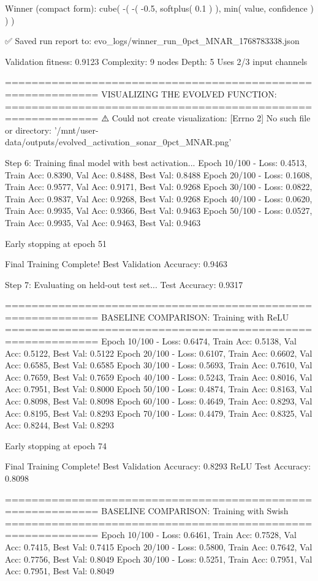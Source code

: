 Winner (compact form):
 cube(
  -(
    -(
      -0.5,
      softplus(
        0.1
      )
    ),
    min(
      value,
      confidence
    )
  )
)

✅ Saved run report to: evo_logs/winner_run_0pct_MNAR_1768783338.json

Validation fitness: 0.9123
Complexity: 9 nodes
Depth: 5
Uses 2/3 input channels

============================================================
VISUALIZING THE EVOLVED FUNCTION:
============================================================
⚠️ Could not create visualization: [Errno 2] No such file or directory: '/mnt/user-data/outputs/evolved_activation_sonar_0pct_MNAR.png'

Step 6: Training final model with best activation...
Epoch  10/100 - Loss: 0.4513, Train Acc: 0.8390, Val Acc: 0.8488, Best Val: 0.8488
Epoch  20/100 - Loss: 0.1608, Train Acc: 0.9577, Val Acc: 0.9171, Best Val: 0.9268
Epoch  30/100 - Loss: 0.0822, Train Acc: 0.9837, Val Acc: 0.9268, Best Val: 0.9268
Epoch  40/100 - Loss: 0.0620, Train Acc: 0.9935, Val Acc: 0.9366, Best Val: 0.9463
Epoch  50/100 - Loss: 0.0527, Train Acc: 0.9935, Val Acc: 0.9463, Best Val: 0.9463

Early stopping at epoch 51

Final Training Complete!
Best Validation Accuracy: 0.9463

Step 7: Evaluating on held-out test set...
Test Accuracy: 0.9317

============================================================
BASELINE COMPARISON: Training with ReLU
============================================================
Epoch  10/100 - Loss: 0.6474, Train Acc: 0.5138, Val Acc: 0.5122, Best Val: 0.5122
Epoch  20/100 - Loss: 0.6107, Train Acc: 0.6602, Val Acc: 0.6585, Best Val: 0.6585
Epoch  30/100 - Loss: 0.5693, Train Acc: 0.7610, Val Acc: 0.7659, Best Val: 0.7659
Epoch  40/100 - Loss: 0.5243, Train Acc: 0.8016, Val Acc: 0.7951, Best Val: 0.8000
Epoch  50/100 - Loss: 0.4874, Train Acc: 0.8163, Val Acc: 0.8098, Best Val: 0.8098
Epoch  60/100 - Loss: 0.4649, Train Acc: 0.8293, Val Acc: 0.8195, Best Val: 0.8293
Epoch  70/100 - Loss: 0.4479, Train Acc: 0.8325, Val Acc: 0.8244, Best Val: 0.8293

Early stopping at epoch 74

Final Training Complete!
Best Validation Accuracy: 0.8293
ReLU Test Accuracy: 0.8098

============================================================
BASELINE COMPARISON: Training with Swish
============================================================
Epoch  10/100 - Loss: 0.6461, Train Acc: 0.7528, Val Acc: 0.7415, Best Val: 0.7415
Epoch  20/100 - Loss: 0.5800, Train Acc: 0.7642, Val Acc: 0.7756, Best Val: 0.8049
Epoch  30/100 - Loss: 0.5251, Train Acc: 0.7951, Val Acc: 0.7951, Best Val: 0.8049

